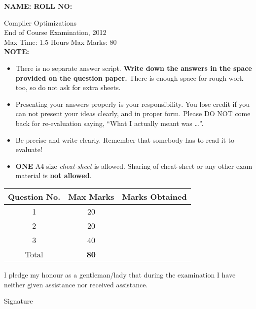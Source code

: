 \documentclass[12pt]{article}
\begin{document}
{\Large\bf NAME: \hspace*{3in} ROLL NO:}

\begin{center}
Compiler Optimizations \\
End of Course Examination, 2012\\
Max Time: 1.5 Hours  \hfill Max Marks: {80} \\

{\bf NOTE: }
\begin{itemize}

\item There is no separate answer script. {\bf Write down the
  answers in the space provided on the question paper.} There
  is enough space for rough work too, so do not ask for extra
  sheets. \\

\item Presenting your answers properly is your
  responsibility. You lose credit if you can not present your
  ideas clearly, and in proper form. Please DO NOT come back
  for re-evaluation saying, ``What I actually meant was
  \ldots''.

\item Be precise and write clearly. Remember that somebody
  has to read it to evaluate!

\item {\bf ONE} A4 size {\em cheat-sheet} is allowed. Sharing
  of cheat-sheet or any other exam material is {\bf not
    allowed}.
\end{itemize}



\vspace*{4mm}

{\Large
\begin{tabular}{|c|c|c|}\hline
Question No. & Max Marks & Marks Obtained \\\hline
1 & 20 & \\\hline
2 & 20 & \\\hline
3 & 40 & \\\hline
Total & \bf{80} & \\\hline
\end{tabular}
}
\end{center}

\vspace*{4mm} I pledge my honour as a gentleman/lady that
during the examination I have neither given assistance nor
received assistance.

\vspace*{1cm}
Signature
\end{document}
